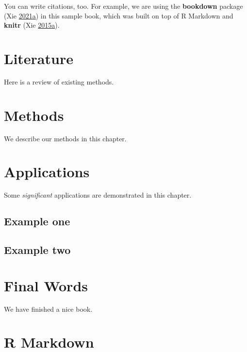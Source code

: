 \documentclass[
  lang=cn,
  11pt,
  scheme=chinese,
  chinesefont=nofont,
  citestyle=gb7714-2015,
  bibstyle=gb7714-2015]{elegantbook}
\begin{document}
You can write citations, too. For example, we are using the \textbf{bookdown} package (Xie \protect\hyperlink{ref-R-bookdown}{2021}\protect\hyperlink{ref-R-bookdown}{a}) in this sample book, which was built on top of R Markdown and \textbf{knitr} (Xie \protect\hyperlink{ref-xie2015}{2015}\protect\hyperlink{ref-xie2015}{a}).

\hypertarget{literature}{%
\chapter{Literature}\label{literature}}

Here is a review of existing methods.

\hypertarget{methods}{%
\chapter{Methods}\label{methods}}

We describe our methods in this chapter.

\hypertarget{applications}{%
\chapter{Applications}\label{applications}}

Some \emph{significant} applications are demonstrated in this chapter.

\hypertarget{example-one}{%
\section{Example one}\label{example-one}}

\hypertarget{example-two}{%
\section{Example two}\label{example-two}}

\hypertarget{final-words}{%
\chapter{Final Words}\label{final-words}}

We have finished a nice book.

\hypertarget{appendix}{%
\appendix}


\hypertarget{r-markdown}{%
\chapter{R Markdown}\label{r-markdown}}
\end{document}
